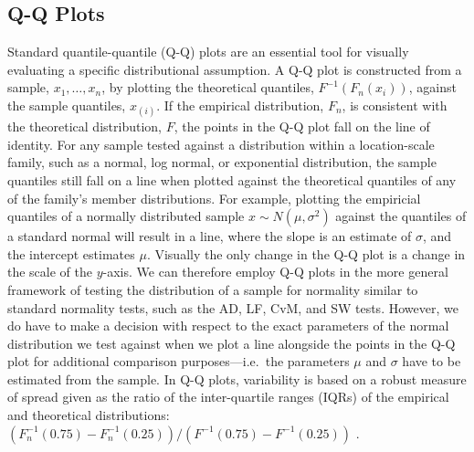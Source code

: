 \documentclass[12pt]{article}\usepackage[]{graphicx}\usepackage[]{color}
\newcommand{\alnote}[1]{\todo[inline,color=green!40]{#1}}
\newcommand{\hhnote}[1]{\todo[inline,color=magenta!40]{#1}}
\begin{document}
\subsection{Q-Q Plots}

Standard quantile-quantile (Q-Q) plots \citep{Wilk:1968} are an essential tool for  visually evaluating a specific distributional assumption.  A Q-Q plot  is constructed from a sample, $x_1, \ldots, x_n$, by plotting the theoretical quantiles, $F^{-1}(F_n(x_i))$, against the sample quantiles, $x_{(i)}$. If the empirical distribution, $F_n$, is consistent with the theoretical distribution, $F$, the points in the Q-Q plot fall on the line of identity. 
For any sample tested against a distribution within a location-scale family, such as a normal, log normal, or exponential distribution, the sample quantiles still fall on a line when plotted against the theoretical quantiles of any of the family's member distributions. For example, plotting the empiricial quantiles of a normally distributed sample $x \sim N(\mu, \sigma^2)$ against the quantiles of a standard normal will result in a line, where  the slope is an estimate of $\sigma$, and the intercept estimates $\mu$. Visually  the only change in the Q-Q plot is a  change in the scale of the $y$-axis. We can therefore employ Q-Q plots in the more general framework of testing the distribution of a sample for normality similar to standard normality tests, such as the AD, LF, CvM, and SW tests. However, we do have to make a decision with respect to the exact parameters of the normal distribution we test against when we plot a line alongside the points in the Q-Q plot for additional comparison purposes---i.e.~the parameters $\mu$ and $\sigma$ have to be estimated from the sample. In Q-Q plots, variability is based on a robust measure of spread given as the ratio of the inter-quartile ranges (IQRs) of the empirical and theoretical distributions: $\left(F^{-1}_n(0.75) - F^{-1}_n(0.25)\right) / \left(F^{-1}(0.75) - F^{-1}(0.25)\right)$ \citep{becker:s}. 

\end{document}
